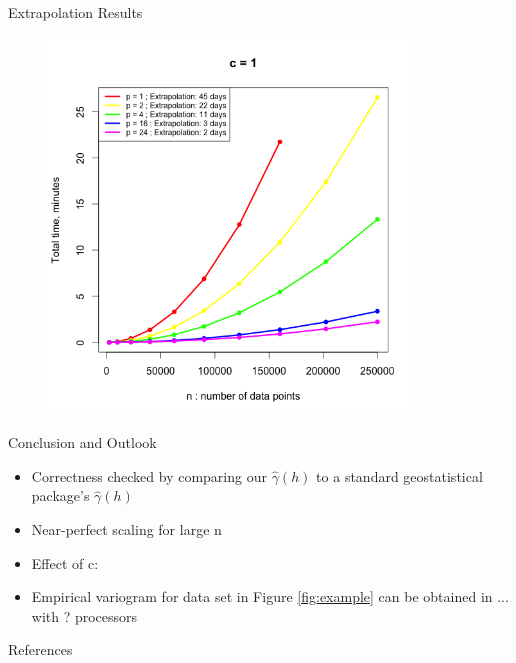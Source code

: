 \documentclass[serif,mathserif,final]{beamer}
\begin{document}
\begin{frame}{}
\begin{columns}[t]
\begin{column}{0.32\linewidth}
      \begin{block}{Extrapolation Results}
        \begin{figure}[htbp]
            \centering
            \includegraphics[height=10cm]{comm_c1_timings.png} %
            \label{fig:plot}
         \end{figure}
      \end{block}

      \begin{block}{Conclusion and Outlook}
        \begin{itemize}
         \item Correctness checked by comparing our $\hat{\gamma}(h)$ to a standard geostatistical package's $\hat{\gamma}(h)$
         \item Near-perfect scaling for large n
         \item Effect of c:
         \item Empirical variogram for data set in Figure \ref{fig:example} can be obtained in ... with ? processors
        \end{itemize}
      \end{block}

      \begin{block}{References}
        
	{\footnotesize
	}
      \end{block}

    \end{column}%

  \end{columns}
\end{frame}
\end{document}
